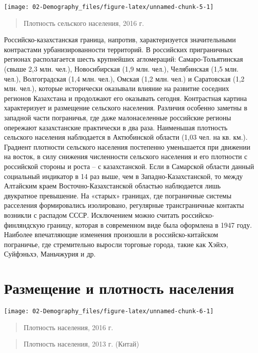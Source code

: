 \documentclass[]{book}
\begin{document}
\texttt{[image: 02-Demography\_files/figure-latex/unnamed-chunk-5-1]}

\begin{quote}
Плотность сельского населения, 2016 г.
\end{quote}

Российско-казахстанская граница, напротив, характеризуется значительными
контрастами урбанизированности территорий. В российских приграничных
регионах располагается шесть крупнейших агломераций: Самаро-Тольятинская
(свыше 2,3 млн. чел.), Новосибирская (1,9 млн. чел.), Челябинская (1,5
млн. чел.), Волгоградская (1,4 млн. чел.), Омская (1,2 млн. чел.) и
Саратовская (1,2 млн. чел.), которые исторически оказывали влияние на
развитие соседних регионов Казахстана и продолжают его оказывать
сегодня. Контрастная картина характеризует и размещение сельского
населения. Различия особенно заметны в западной части пограничья, где
даже малонаселенные российские регионы опережают казахстанские
практически в два раза. Наименьшая плотность сельского населения
наблюдается в Актюбинской области (1,03 чел. на кв. км.). Градиент
плотности сельского населения постепенно уменьшается при движении на
восток, в силу снижения численности сельского населения и его плотности
с российской стороны и роста -- с казахстанской. Если в Самарской
области данный социальный индикатор в 14 раз выше, чем в
Западно-Казахстанской, то между Алтайским краем Восточно-Казахстанской
областью наблюдается лишь двукратное превышение. На «старых» границах,
где пограничные системы расселения формировались изолировано, регулярные
трансграничные контакты возникли с распадом СССР. Исключением можно
считать российско-финляндскую границу, которая в современном виде была
оформлена в 1947 году. Наиболее впечатляющие изменения произошли в
российско-китайском пограничье, где стремительно выросли торговые
города, такие как Хэйхэ, Суйфэньхэ, Маньчжурия и др.

\section{Размещение и плотность населения}\label{demo-dens}

\texttt{[image: 02-Demography\_files/figure-latex/unnamed-chunk-6-1]}

\begin{quote}
Плотность населения, 2016 г.
\end{quote}

\begin{quote}
Плотность населения, 2013 г. (Китай)
\end{quote}
\end{document}
